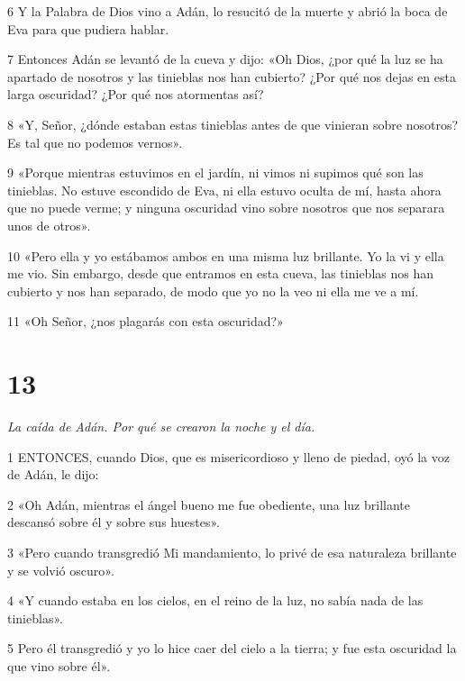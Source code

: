 \par 6 Y la Palabra de Dios vino a Adán, lo resucitó de la muerte y abrió la boca de Eva para que pudiera hablar.

\par 7 Entonces Adán se levantó de la cueva y dijo: «Oh Dios, ¿por qué la luz se ha apartado de nosotros y las tinieblas nos han cubierto? ¿Por qué nos dejas en esta larga oscuridad? ¿Por qué nos atormentas así?

\par 8 «Y, Señor, ¿dónde estaban estas tinieblas antes de que vinieran sobre nosotros? Es tal que no podemos vernos».

\par 9 «Porque mientras estuvimos en el jardín, ni vimos ni supimos qué son las tinieblas. No estuve escondido de Eva, ni ella estuvo oculta de mí, hasta ahora que no puede verme; y ninguna oscuridad vino sobre nosotros que nos separara unos de otros».

\par 10 «Pero ella y yo estábamos ambos en una misma luz brillante. Yo la vi y ella me vio. Sin embargo, desde que entramos en esta cueva, las tinieblas nos han cubierto y nos han separado, de modo que yo no la veo ni ella me ve a mí.

\par 11 «Oh Señor, ¿nos plagarás con esta oscuridad?»

\chapter{13}

\par \textit{La caída de Adán. Por qué se crearon la noche y el día.}

\par 1 ENTONCES, cuando Dios, que es misericordioso y lleno de piedad, oyó la voz de Adán, le dijo:

\par 2 «Oh Adán, mientras el ángel bueno me fue obediente, una luz brillante descansó sobre él y sobre sus huestes».

\par 3 «Pero cuando transgredió Mi mandamiento, lo privé de esa naturaleza brillante y se volvió oscuro».

\par 4 «Y cuando estaba en los cielos, en el reino de la luz, no sabía nada de las tinieblas».

\par 5 Pero él transgredió y yo lo hice caer del cielo a la tierra; y fue esta oscuridad la que vino sobre él».

